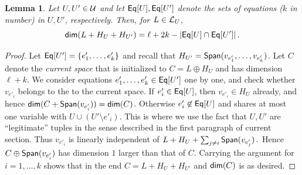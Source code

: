 \documentclass[11pt]{article}
\numberwithin{equation}{section}
\newtheorem{lemma}[theorem]{Lemma}
\theoremstyle{definition}
\theoremstyle{plain}
\newcommand*\xor{\mathbin{\oplus}}
\begin{document}
\begin{lemma}\label{lem:intuition_aux1} Let $U, U' \in {\cal U}$ and
let  %
${\sf Eq}[U], {\sf Eq}[U']$ denote the sets of equations ($k$ in number)
in $U, U'$, respectively.  %
%
Then, for
$L \in {\cal L}_U$, $$ {\sf dim} (L + H_U + H_{U'}) = \ell + 2k  - |{\sf Eq}[U] \cap {\sf Eq}[U']|\,.$$%
\end{lemma}
\begin{proof}Let ${\sf Eq}[U'] = \{ e'_1, \ldots, e'_k \}$ and recall that $H_{U'} = {\sf Span}(v_{e'_1},\ldots,v_{e'_k} )$.
Let $C$ denote the %
\emph{current space}  %
that is initialized to  $C = L \xor H_U$ and has
dimension $\ell+k$. We consider
equations $e'_1, \ldots, e'_k  \in {\sf Eq}[U']$ one by one,
and check whether %
%
%
%
%
%
%
%
%
%
$v_{e'_i}$  
belongs to the   %
%
%
%
to the current space.
%
If %
$e'_i \in {\sf Eq}[U]$, then $v_{e'_i} \in H_U$ already,
and hence ${\sf dim} (C + {\sf Span}(v_{e'_i}))= {\sf dim}(C)$.
Otherwise $e'_i \not\in {\sf Eq}[U]$ and shares at most one variable with $U \cup (U' \setminus e'_i)$. This is where we use the fact that $U, U'$ are ``legitimate''
tuples in the sense described in the first paragraph of current section.
Thus $v_{e'_i}$ is linearly independent of
%
$L + H_U +\sum_{j \neq  i} {\sf Span}( v_{e'_j} )\,.$ %
%
Hence $C \xor  {\sf Span}(v_{e'_i})$ has dimension $1$ larger than that of $C$. Carrying the
argument for $i=1,\ldots,k$ shows that in the end $C = L + H_U +H_{U'}$ and ${\sf dim}(C)$ is as desired.
\end{proof}

%
%
%
%
%
\end{document}
